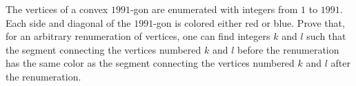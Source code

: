 The vertices of a convex $1991$-gon are enumerated with integers from $1$ to $1991$. Each side and diagonal of the $1991$-gon is colored either red or blue. Prove that, for an arbitrary renumeration of vertices, one can find integers $k$ and $l$ such that the segment connecting the vertices numbered $k$ and $l$ before the renumeration has the same color as the segment connecting the vertices numbered $k$ and $l$ after the renumeration.